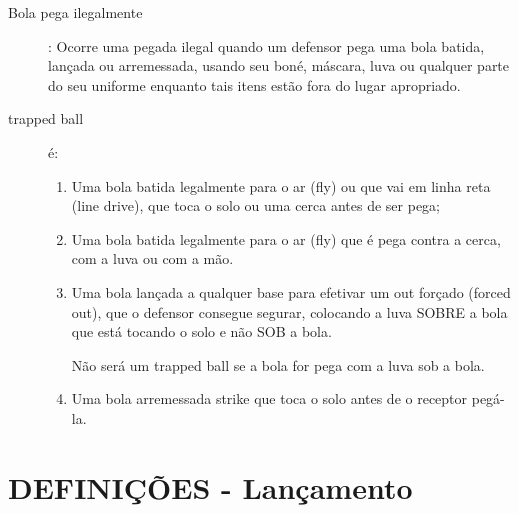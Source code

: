 \begin{description}
	\item[Bola pega ilegalmente]: Ocorre uma pegada ilegal quando um defensor pega uma bola batida, lan\c{c}ada ou arremessada, usando seu bon\'e, m\'ascara, luva ou qualquer parte do seu uniforme enquanto tais itens est\~ao fora do lugar apropriado. 

	\item[\Gls{trapped ball}] \'e: 

	\begin{enumerate}[label=\alph*)]
		\item Uma bola batida legalmente para o ar (\gls{fly}) ou que vai em linha reta (\gls{line drive}), que toca o solo ou uma cerca antes de ser pega; 
		
		\item  Uma bola batida legalmente para o ar (\gls{fly}) que \'e pega contra a cerca, com a luva ou com a m\~ao. 
		
		\item  Uma bola lan\c{c}ada a qualquer base para efetivar um \gls{out} for\c{c}ado (\gls{forced out}), que o defensor consegue segurar, colocando a luva SOBRE a bola que est\'a tocando o solo e n\~ao SOB a bola. 
		
		N\~ao ser\'a um \gls{trapped ball} se a bola for pega com a luva sob a bola. 
		
		\item  Uma bola arremessada \gls{strike} que toca o solo antes de o receptor peg\'a-la. 
	\end{enumerate}


	\end{description}

	\section{DEFINI\c{C}\~OES - Lan\c{c}amento}

